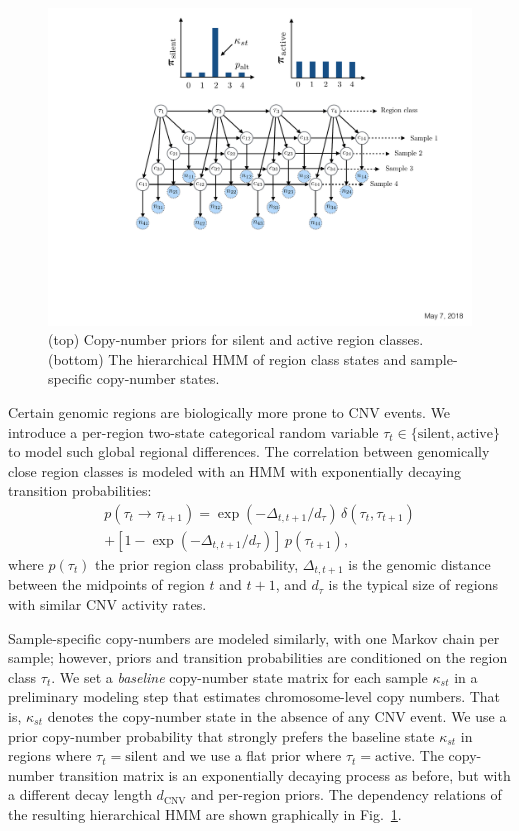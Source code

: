 \documentclass[sigplan]{acmart}\settopmatter{printfolios=true,printccs=false,printacmref=false}
\begin{document}
\begin{figure}
\includegraphics[width=\columnwidth]{figures/germline-cnv-caller-model/hhmm.pdf}
\caption{(top) Copy-number priors for silent and active region classes. (bottom) The hierarchical HMM of region class states and sample-specific copy-number states.}
\label{fig:hhmm}
\end{figure}
Certain genomic regions are biologically more prone to CNV events. We introduce a per-region two-state categorical random variable $\tau_t \in \{\mathrm{silent}, \mathrm{active}\}$ to model such global regional differences. The correlation between genomically close region classes is modeled with an HMM with exponentially decaying transition probabilities:
\begin{multline}
p(\tau_t \rightarrow \tau_{t+1}) = \exp(-\Delta_{t, t+1}/d_\tau) \, \delta(\tau_t, \tau_{t+1}) \\+ [1 - \exp(-\Delta_{t, t+1}/d_\tau)]\,p(\tau_{t+1}),
\end{multline}
where $p(\tau_{t})$ the prior region class probability, $\Delta_{t, t+1}$ is the genomic distance between the midpoints of region $t$ and $t+1$, and $d_\tau$ is the typical size of regions with similar CNV activity rates.

Sample-specific copy-numbers are modeled similarly, with one Markov chain per sample; however, priors and transition probabilities are conditioned on the region class $\tau_t$. We set a {\em baseline} copy-number state matrix for each sample $\kappa_{st}$ in a preliminary modeling step that estimates chromosome-level copy numbers. That is, $\kappa_{st}$ denotes the copy-number state in the absence of any CNV event. We use a prior copy-number probability that strongly prefers the baseline state $\kappa_{st}$ in regions where $\tau_t = \mathrm{silent}$ and we use a flat prior where $\tau_t = \mathrm{active}$. The copy-number transition matrix is an exponentially decaying process as before, but with a different decay length $d_\mathrm{CNV}$ and per-region priors. The dependency relations of the resulting hierarchical HMM are shown graphically in Fig.~\ref{fig:hhmm}.\\
\end{document}
